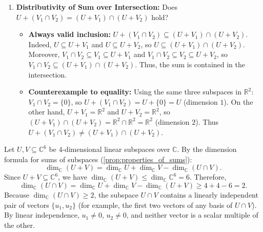 \begin{exercisesolution*}
\begin{enumerate}[label=\textbf{(\alph*)}]
    \item \textbf{Distributivity of Sum over Intersection:}
    Does $U + (V_1 \cap V_2) = (U + V_1) \cap (U + V_2)$ hold?
    \begin{itemize}
        \item \textbf{Always valid inclusion:} $U + (V_1 \cap V_2) \subseteq (U + V_1) \cap (U + V_2)$.
        Indeed, $U \subseteq U + V_1$ and $U \subseteq U + V_2$, so $U \subseteq (U + V_1) \cap (U + V_2)$. Moreover, $V_1 \cap V_2 \subseteq V_1 \subseteq U + V_1$ and $V_1 \cap V_2 \subseteq V_2 \subseteq U + V_2$, so $V_1 \cap V_2 \subseteq (U + V_1) \cap (U + V_2)$. Thus, the sum is contained in the intersection.
        \item \textbf{Counterexample to equality:} Using the same three subspaces in $\mathbb{R}^2$:
        $V_1 \cap V_2 = \{0\}$, so $U + (V_1 \cap V_2) = U + \{0\} = U$ (dimension $1$).
        On the other hand, $U + V_1 = \mathbb{R}^2$ and $U + V_2 = \mathbb{R}^2$, so $(U + V_1) \cap (U + V_2) = \mathbb{R}^2 \cap \mathbb{R}^2 = \mathbb{R}^2$ (dimension $2$).
        Thus $U + (V_1 \cap V_2) \ne (U + V_1) \cap (U + V_2)$.
    \end{itemize}
\end{enumerate}
\end{exercisesolution*}

\begin{exercisesolution}
\label{sol:intersection_four_dim_subspaces}
Let $U, V \subseteq \mathbb{C}^6$ be $4$-dimensional linear subspaces over $\mathbb{C}$. By the dimension formula for sums of subspaces (\cref{prop:properties_of_sums}):
\[
\dim_{\mathbb{C}}(U + V) = \dim_{\mathbb{C}} U + \dim_{\mathbb{C}} V - \dim_{\mathbb{C}}(U \cap V).
\]
Since $U + V \subseteq \mathbb{C}^6$, we have $\dim_{\mathbb{C}}(U + V) \le \dim_{\mathbb{C}} \mathbb{C}^6 = 6$. Therefore,
\[
\dim_{\mathbb{C}}(U \cap V) = \dim_{\mathbb{C}} U + \dim_{\mathbb{C}} V - \dim_{\mathbb{C}}(U + V) \ge 4 + 4 - 6 = 2.
\]
Because $\dim_{\mathbb{C}}(U \cap V) \ge 2$, the subspace $U \cap V$ contains a linearly independent pair of vectors $\{u_1, u_2\}$ (for example, the first two vectors of any basis of $U \cap V$).
By linear independence, $u_1 \ne 0$, $u_2 \ne 0$, and neither vector is a scalar multiple of the other.
\end{exercisesolution}

